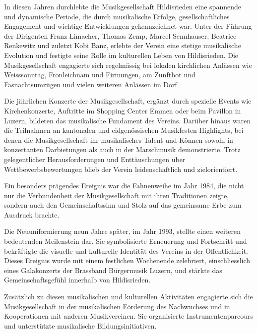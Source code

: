 \begin{history}

    In diesen Jahren durchlebte die Musikgesellschaft Hildisrieden eine
    spannende und dynamische Periode, die durch musikalische Erfolge,
    gesellschaftliches Engagement und wichtige Entwicklungen gekennzeichnet war.
    Unter der Führung der Dirigenten Franz Limacher, Thomas Zemp, Marcel
    Sennhauser, Beatrice Renkewitz und zuletzt Kobi Banz, erlebte der Verein
    eine stetige musikalische Evolution und festigte seine Rolle im kulturellen
    Leben von Hildisrieden. Die Musikgesellschaft engagierte sich regelmässig
    bei lokalen kirchlichen Anlässen wie Weisssonntag, Fronleichnam und
    Firmungen, am Zunftbot und Fasnachtsumzügen und vielen weiteren Anlässen im
    Dorf.

    Die jährlichen Konzerte der Musikgesellschaft, ergänzt durch spezielle
    Events wie Kirchenkonzerte, Auftritte im Shopping Center Emmen oder beim
    Pavillon in Luzern, bildeten das musikalische Fundament des Vereins. Darüber
    hinaus waren die Teilnahmen an kantonalen und eidgenössischen Musikfesten
    Highlights, bei denen die Musikgesellschaft ihr musikalisches Talent und
    Können sowohl in konzertanten Darbietungen als auch in der Marschmusik
    demonstrierte. Trotz gelegentlicher Herausforderungen und Enttäuschungen
    über Wettbewerbsbewertungen blieb der Verein leidenschaftlich und
    zielorientiert.

    Ein besonders prägendes Ereignis war die Fahnenweihe im Jahr 1984, die nicht
    nur die Verbundenheit der Musikgesellschaft mit ihren Traditionen zeigte,
    sondern auch den Gemeinschaftssinn und Stolz auf das gemeinsame Erbe zum
    Ausdruck brachte.

    Die Neuuniformierung neun Jahre später, im Jahr 1993, stellte einen weiteren
    bedeutenden Meilenstein dar. Sie symbolisierte Erneuerung und Fortschritt
    und bekräftigte die visuelle und kulturelle Identität des Vereins in der
    Öffentlichkeit. Dieses Ereignis wurde mit einem festlichen Wochenende
    zelebriert, einschliesslich eines Galakonzerts der Brassband Bürgermusik
    Luzern, und stärkte das Gemeinschaftsgefühl innerhalb von Hildisrieden.

    Zusätzlich zu diesen musikalischen und kulturellen Aktivitäten engagierte
    sich die Musikgesellschaft in der musikalischen Förderung des Nachwuchses
    und in Kooperationen mit anderen Musikvereinen. Sie organisierte
    Instrumentenparcours und unterstützte musikalische Bildungsinitiativen.


\end{history}
